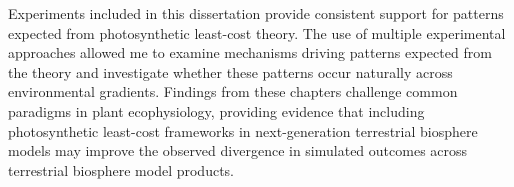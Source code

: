 \documentclass{ttuthes2007}
\begin{document}
Experiments included in this dissertation provide consistent support for patterns expected from photosynthetic least-cost theory. The use of multiple experimental approaches allowed me to examine mechanisms driving patterns expected from the theory and investigate whether these patterns occur naturally across environmental gradients. Findings from these chapters challenge common paradigms in plant ecophysiology, providing evidence that including photosynthetic least-cost frameworks in next-generation terrestrial biosphere models may improve the observed divergence in simulated outcomes across terrestrial biosphere model products.

\listoftables
\listoffigures

\mainmatter


\linenumbers
\renewcommand{\linenumberfont}{\normalfont\bfseries\large\color{black}}





\end{document}
